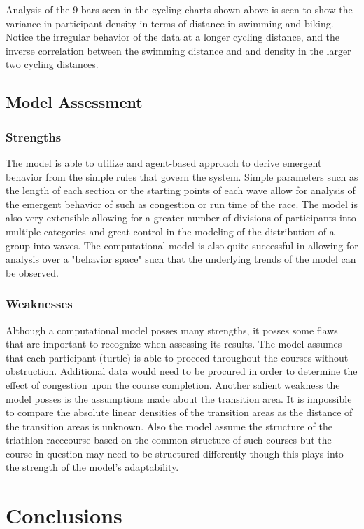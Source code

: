 \documentclass[12pt]{article}
\begin{document}
Analysis of the 9 bars seen in the cycling charts shown above is seen to show the variance in participant density in terms of distance in swimming and biking.  Notice the irregular behavior of the data at a longer cycling distance, and the inverse correlation between the swimming distance and and density in the larger two cycling distances.
\subsection{Model Assessment}
\subsubsection*{Strengths}
The model is able to utilize and agent-based approach to derive emergent behavior from the simple rules that govern the system. Simple parameters such as the length of each section or the starting points of each wave allow for analysis of the emergent behavior of such as congestion or run time of the race. The model is also very extensible allowing for a greater number of divisions of participants into multiple categories and great control in the modeling of the distribution of a group into waves. The computational model is also quite successful in allowing for analysis over a "behavior space" such that the underlying trends of the model can be observed.
\subsubsection*{Weaknesses}
Although a computational model posses many strengths, it posses some flaws that are important to recognize when assessing its results. The model assumes that each participant (turtle) is able to proceed throughout the courses without obstruction. Additional data would need to be procured in order to determine the effect of congestion upon the course completion. Another salient weakness the model posses is the assumptions made about the transition area. It is impossible to compare the absolute linear densities of the transition areas as the distance of the transition areas is unknown. Also the model assume the structure of the triathlon racecourse based on the common structure of such courses but the course in question may need to be structured differently though this plays into the strength of the model's adaptability.
\section{Conclusions}
\end{document}
